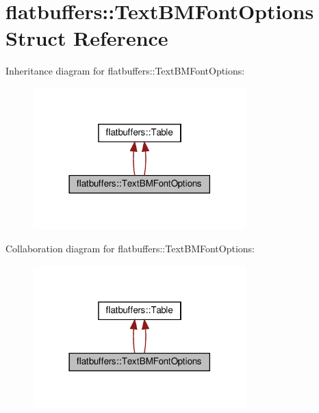 \hypertarget{structflatbuffers_1_1TextBMFontOptions}{}\section{flatbuffers\+:\+:Text\+B\+M\+Font\+Options Struct Reference}
\label{structflatbuffers_1_1TextBMFontOptions}


Inheritance diagram for flatbuffers\+:\+:Text\+B\+M\+Font\+Options\+:
\nopagebreak
\begin{figure}[H]
\begin{center}
\leavevmode
\includegraphics[width=234pt]{structflatbuffers_1_1TextBMFontOptions__inherit__graph}
\end{center}
\end{figure}


Collaboration diagram for flatbuffers\+:\+:Text\+B\+M\+Font\+Options\+:
\nopagebreak
\begin{figure}[H]
\begin{center}
\leavevmode
\includegraphics[width=234pt]{structflatbuffers_1_1TextBMFontOptions__coll__graph}
\end{center}
\end{figure}
